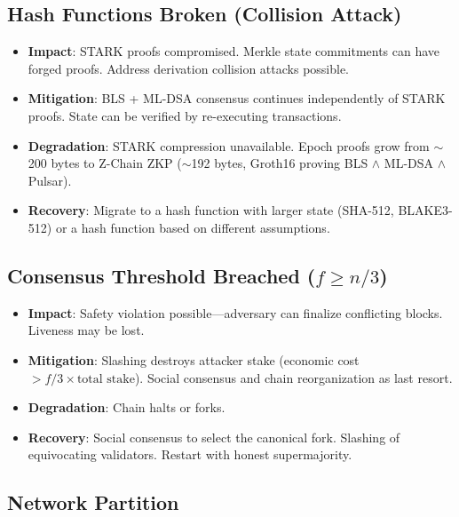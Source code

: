 \subsection{Hash Functions Broken (Collision Attack)}

\begin{itemize}[leftmargin=2em]
  \item \textbf{Impact}: STARK proofs compromised. Merkle state commitments can have
        forged proofs. Address derivation collision attacks possible.
  \item \textbf{Mitigation}: BLS + ML-DSA consensus continues independently of
        STARK proofs. State can be verified by re-executing transactions.
  \item \textbf{Degradation}: STARK compression unavailable. Epoch proofs grow from
        $\sim$200 bytes to Z-Chain ZKP ($\sim$192 bytes, Groth16 proving BLS $\land$ ML-DSA $\land$ Pulsar).
  \item \textbf{Recovery}: Migrate to a hash function with larger state (SHA-512,
        BLAKE3-512) or a hash function based on different assumptions.
\end{itemize}

\subsection{Consensus Threshold Breached ($f \geq n/3$)}

\begin{itemize}[leftmargin=2em]
  \item \textbf{Impact}: Safety violation possible---adversary can finalize conflicting
        blocks. Liveness may be lost.
  \item \textbf{Mitigation}: Slashing destroys attacker stake (economic cost $> f/3 \times
        \text{total stake}$). Social consensus and chain reorganization as last resort.
  \item \textbf{Degradation}: Chain halts or forks.
  \item \textbf{Recovery}: Social consensus to select the canonical fork. Slashing of
        equivocating validators. Restart with honest supermajority.
\end{itemize}

\subsection{Network Partition}

